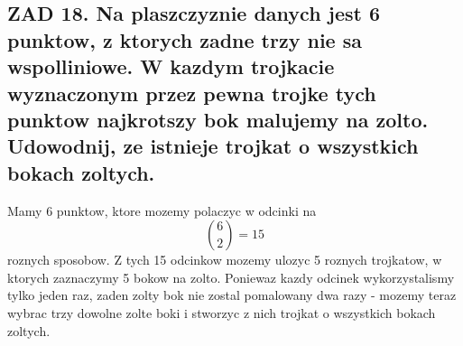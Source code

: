 \documentclass{article}
\begin{document}
  \begin{center}
  \end{center}
\subsection*{ZAD 18. Na plaszczyznie danych jest 6 punktow, z ktorych zadne trzy nie sa wspolliniowe. W kazdym trojkacie wyznaczonym przez pewna trojke tych punktow najkrotszy bok malujemy na zolto. Udowodnij, ze istnieje trojkat o wszystkich bokach zoltych.}
  Mamy 6 punktow, ktore mozemy polaczyc w odcinki na
  $${6\choose2}=15$$
  roznych sposobow. Z tych 15 odcinkow mozemy ulozyc 5 roznych trojkatow, w ktorych zaznaczymy 5 bokow na zolto. Poniewaz kazdy odcinek wykorzystalismy tylko jeden raz, zaden zolty bok nie zostal pomalowany dwa razy - mozemy teraz wybrac trzy dowolne zolte boki i stworzyc z nich trojkat o wszystkich bokach zoltych.
\end{document}
